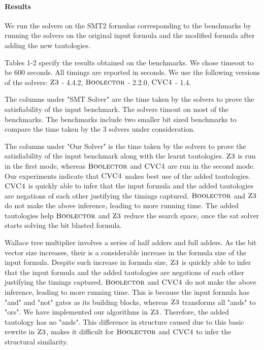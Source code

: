 \paragraph{\bf Results}
%
We run the solvers on the SMT2 formulas corresponding to the benchmarks by running the solvers on the original input formula and the modified formula after adding the new tautologies.
%

Tables 1-2 specify the results obtained on the benchmarks. We chose timeout to be 600 seconds. All timings are reported in seconds. We use the following versions of the solvers: $\textsc{Z3}$ - 4.4.2, $\textsc{Boolector}$ - 2.2.0, $\textsc{CVC4}$ - 1.4.
%



The columns under "SMT Solver" are the time taken by the solvers to prove the satisfiability of the input benchmark. The solvers timout on most of the benchmarks. The benchmarks include two smaller bit sized benchmarks to compare the time taken by the 3 solvers under consideration.

The columns under "Our Solver" is the time taken by the solvers to prove the satisfiability of the input benchmark along with the learnt tautologies. $\textsc{Z3}$ is run in the first mode, whereas $\textsc{Boolector}$ and $\textsc{CVC4}$ are run in the second mode. 
%
Our experiments indicate that $\textsc{CVC4}$ makes best use of the added tautologies. $\textsc{CVC4}$ is quickly able to infer that the input formula and the added tautologies are negations of each other justifying the timings captured. 
$\textsc{Boolector}$ and $\textsc{Z3}$ do not make the above inference, leading to more running time. The added tautologies help $\textsc{Boolector}$ and $\textsc{Z3}$ reduce the search space, once the sat solver starts solving the bit blasted formula.




Wallace tree multiplier involves a series of half adders and full adders. As the bit vector size increases, their is a considerable increase in the formula size of the input formula. Despite such increase in formula size, $\textsc{Z3}$ is quickly able to infer that the input formula and the added tautologies are negations of each other justifying the timings captured. $\textsc{Boolector}$ and $\textsc{CVC4}$ do not make the above inference, leading to more running time. This is because the input formula has "and" and "not" gates as its building blocks, whereas $\textsc{Z3}$ transforms all "ands" to "ors". We have implemented our algorithms in $\textsc{Z3}$. Therefore, the added tautology has no "ands". This difference in structure caused due to this basic rewrite in $\textsc{Z3}$, makes it difficult for $\textsc{Boolector}$ and $\textsc{CVC4}$ to infer the structural similarity. 

